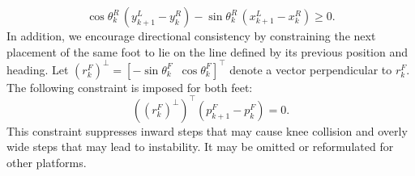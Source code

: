 \documentclass[letterpaper, 10 pt, journal, twoside]{IEEEtran}
\begin{document}
\begin{equation}
    \cos\theta_k^{R}\,(y_{k+1}^{L} - y_k^{R}) - \sin\theta_k^{R}\,(x_{k+1}^{L} - x_k^{R}) \ge 0.
\label{eq:nonconvex_4}
\end{equation}
\indent
In addition, we encourage directional consistency by constraining the next placement of the same foot to lie on the line defined by its previous position and heading.
Let $(r_k^F)^\perp = [-\sin\theta_k^F\;\; \cos\theta_k^F]^\top$ denote a vector perpendicular to $r_k^F$.
The following constraint is imposed for both feet:
\begin{equation}
    ((r_k^F)^\perp)^\top (p_{k+1}^F - p_k^F) = 0.
\label{eq:nonconvex_5}
\end{equation}
This constraint suppresses inward steps that may cause knee collision and overly wide steps that may lead to instability.
It may be omitted or reformulated for other platforms.
\end{document}
